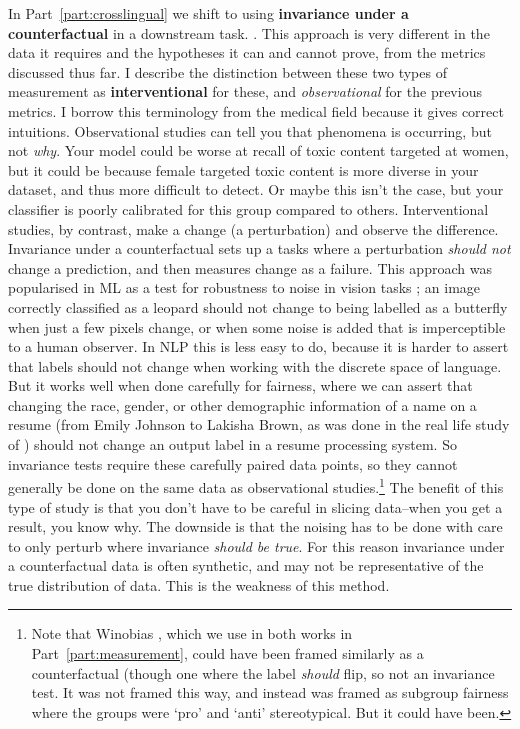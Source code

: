 In Part~\ref{part:crosslingual} we shift to using \textbf{invariance under a counterfactual} in a downstream task. . This approach is very different in the data it requires and the hypotheses it can and cannot prove, from the metrics discussed thus far. I describe the distinction between these two types of measurement as \textbf{interventional} for these, and \textit{observational} for the previous metrics. I borrow this terminology from the medical field because it gives correct intuitions. Observational studies can tell you that phenomena is occurring, but not \textit{why}. Your model could be worse at recall of toxic content targeted at women, but it could be because female targeted toxic content is more diverse in your dataset, and thus more difficult to detect. Or maybe this isn't the case, but your classifier is poorly calibrated for this group compared to others. Interventional studies, by contrast, make a change (a perturbation) and observe the difference. Invariance under a counterfactual sets up a tasks where a perturbation \textit{should not} change a prediction, and then measures change as a failure. This approach was popularised in ML as a test for robustness to noise in vision tasks \citep{Zheng2016ImprovingTR}; an image correctly classified as a leopard should not change to being labelled as a butterfly when just a few pixels change, or when some noise is added that is imperceptible to a human observer. In NLP this is less easy to do, because it is harder to assert that labels should not change when working with the discrete space of language. But it works well when done carefully for fairness, where we can assert that changing the race, gender, or other demographic information of a name on a resume (from Emily Johnson to Lakisha Brown, as was done in the real life study of \citet{bertrand2004emily}) should not change an output label in a resume processing system. So invariance tests require these carefully paired data points, so they cannot generally be done on the same data as observational studies.\footnote{Note that Winobias \citep{zhao-etal-2018-gender}, which we use in both works in Part~\ref{part:measurement}, could have been framed similarly as a counterfactual (though one where the label \textit{should} flip, so not an invariance test. It was not framed this way, and instead was framed as subgroup fairness where the groups were `pro' and `anti' stereotypical. But it could have been.} The benefit of this type of study is that you don't have to be careful in slicing data--when you get a result, you know why. The downside is that the noising has to be done with care to only perturb where invariance \textit{should be true}. For this reason invariance under a counterfactual data is often synthetic, and may not be representative of the true distribution of data. This is the weakness of this method.

